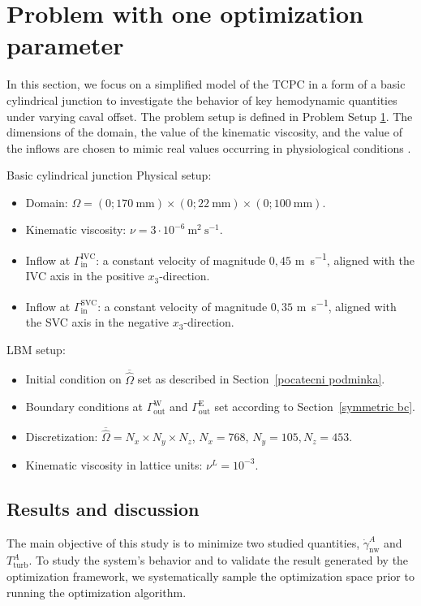 \section{Problem with one optimization parameter}
In this section, we focus on a simplified model of the TCPC in a form of a basic cylindrical junction to investigate the behavior of key hemodynamic quantities under varying caval offset. The problem setup is defined in Problem Setup \hyperlink{page.48}{1}. The dimensions of the domain, the value of the kinematic viscosity, and the value of the inflows are chosen to mimic real values occurring in physiological conditions \cite{Rijnberg2018}.

\vspace{2mm}
\begin{problem}{Basic cylindrical junction}
	\vspace{2mm}
	Physical setup:
	\begin{itemize}
		\item Domain: $ \Omega=(0 ; 170 \mathrm{~mm}) \times(0 ; 22 \mathrm{~mm}) \times(0 ; 100 \mathrm{~mm})$.
		\item Kinematic viscosity: $ \nu=3 \cdot 10^{-6} \mathrm{~m}^{2} \mathrm{~s}^{-1}$.
		\item Inflow at $\Gamma^{\text{IVC}}_{\text{in}}$: a constant velocity of magnitude $0{,}45$ \si{m s^{-1}},  aligned with the IVC axis in the positive $x_3$-direction.
		\item Inflow at $\Gamma^{\text{SVC}}_{\text{in}}$: a constant velocity of magnitude $0{,}35$ \si{m s^{-1}}, aligned with the SVC axis in the negative $x_3$-direction.
	\end{itemize} 
	LBM setup:
	\begin{itemize}
		\item Initial condition on $ \overline{\hat{\Omega}} $ set as described in Section~\ref{pocatecni podminka}.
		\item Boundary conditions at $\Gamma^{\text{W}}_{\text{out}}$ and $\Gamma^{\text{E}}_{\text{out}}$ set according to Section~\ref{symmetric bc}.
		\item Discretization: $\overline{\hat{\Omega}} = N_{x} \times N_{y} \times N_{z}$, $N_{x} = 768, \, N_{y} = 105, N_{z} = 453$.
		\item Kinematic viscosity in lattice units: $\nu^{L} = 10^{-3} $.
	\end{itemize}
	
\end{problem}

\subsection{Results and discussion}
The main objective of this study is to minimize two studied quantities, $\dot{\gamma}^{A}_{\mathrm{nw}}$ and $T^{A}_{\mathrm{turb}}$. To study the system's behavior and to validate the result generated by the optimization framework, we systematically sample the optimization space prior to running the optimization algorithm.

